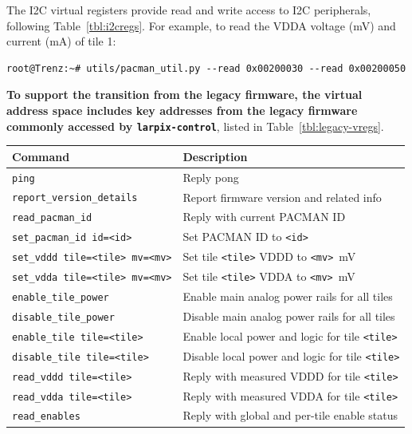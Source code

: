 \documentclass[12pt]{article}
\begin{document}
The I2C virtual registers provide read and write access to I2C peripherals, following
Table~\ref{tbl:i2cregs}.  For example, to read the VDDA voltage (mV) and current (mA) of tile 1:
\begin{lstlisting}[frame=leftline]
root@Trenz:~# utils/pacman_util.py --read 0x00200030 --read 0x00200050
\end{lstlisting}

{\bf To support the transition from the legacy firmware, the virtual address space includes key addresses from the legacy firmware commonly accessed by \texttt{larpix-control}}, listed in Table~\ref{tbl:legacy-vregs}.

\begin{table}[h]
\centering
\begin{tabular}{|l|l|}
\hline
\textbf{Command} & \textbf{Description} \\
\hline
\texttt{ping}                              & Reply pong \\
\texttt{report\_version\_details}          & Report firmware version and related info \\
\texttt{read\_pacman\_id}                  & Reply with current PACMAN ID \\
\hline
\texttt{set\_pacman\_id id=<id>}           & Set PACMAN ID to \texttt{<id>} \\
\texttt{set\_vddd tile=<tile> mv=<mv>}     & Set tile \texttt{<tile>} VDDD to \texttt{<mv>}~mV \\
\texttt{set\_vdda tile=<tile> mv=<mv>}     & Set tile \texttt{<tile>} VDDA to \texttt{<mv>}~mV \\
\texttt{enable\_tile\_power}               & Enable main analog power rails for all tiles \\
\texttt{disable\_tile\_power}              & Disable main analog power rails for all tiles \\
\texttt{enable\_tile tile=<tile>}          & Enable local power and logic for tile \texttt{<tile>} \\
\texttt{disable\_tile tile=<tile>}         & Disable local power and logic for tile \texttt{<tile>} \\
\texttt{read\_vddd tile=<tile>}            & Reply with measured VDDD for tile \texttt{<tile>} \\
\texttt{read\_vdda tile=<tile>}            & Reply with measured VDDA for tile \texttt{<tile>} \\
\texttt{read\_enables}                     & Reply with global and per-tile enable status \\

\end{tabular}
\end{table}
\end{document}
